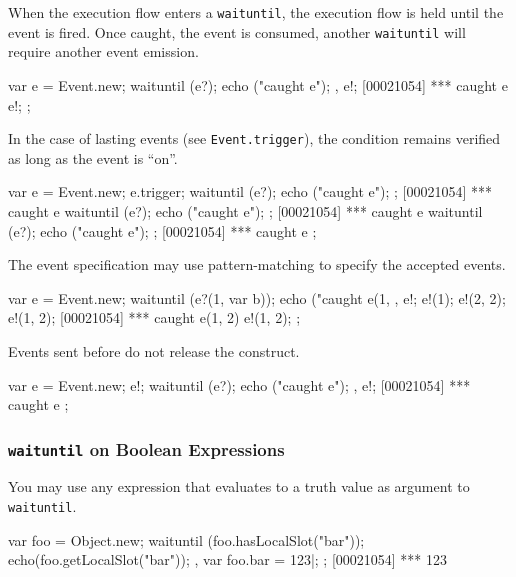 When the execution flow enters a \lstinline|waituntil|, the execution
flow is held until the event is fired.  Once caught, the event is
consumed, another \lstinline|waituntil| will require another event
emission.

\begin{urbiscript}
{
  var e = Event.new;
  {
    waituntil (e?);
    echo ("caught e");
  },
  e!;
[00021054] *** caught e
  e!;
};
\end{urbiscript}

In the case of lasting events (see \lstinline|Event.trigger|), the
condition remains verified as long as the event is ``on''.

\begin{urbiscript}
{
  var e = Event.new;
  e.trigger;
  {
    waituntil (e?);
    echo ("caught e");
  };
[00021054] *** caught e
  {
    waituntil (e?);
    echo ("caught e");
  };
[00021054] *** caught e
  {
    waituntil (e?);
    echo ("caught e");
  };
[00021054] *** caught e
};
\end{urbiscript}

The event specification may use pattern-matching to specify the
accepted events.

\begin{urbiscript}
{
  var e = Event.new;
  {
    waituntil (e?(1, var b));
    echo ("caught e(1, %
  },
  e!;
  e!(1);
  e!(2, 2);
  e!(1, 2);
[00021054] *** caught e(1, 2)
  e!(1, 2);
};
\end{urbiscript}

Events sent before do not release the construct.

\begin{urbiscript}
{
  var e = Event.new;
  e!;
  {
    waituntil (e?);
    echo ("caught e");
  },
  e!;
[00021054] *** caught e
};
\end{urbiscript}

\subsubsection{\lstinline'waituntil' on Boolean Expressions}

You may use any expression that evaluates to a truth value as argument
to \lstinline'waituntil'.

\begin{urbiscript}
{
  var foo = Object.new;
  {
    waituntil (foo.hasLocalSlot("bar"));
    echo(foo.getLocalSlot("bar"));
  },
  var foo.bar = 123|;
};
[00021054] *** 123
\end{urbiscript}

